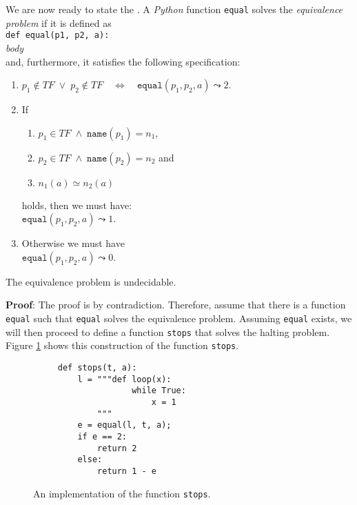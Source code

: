 \noindent
We are now ready to state the .  A \textsl{Python} function \texttt{equal} solves the
\emph{equivalence problem}  if it is defined as
\\[0.2cm]
\hspace*{1.3cm} \texttt{def equal(p1, p2, a):}               \\
\hspace*{2.1cm} \textsl{body}                                \\[0.2cm]
and, furthermore, it satisfies the following specification:
\begin{enumerate}
\item $p_1 \not\in T\!F \;\vee\; p_2 \not\in T\!F \quad\Leftrightarrow\quad \mathtt{equal}(p_1, p_2, a) \leadsto 2$.
\item If 
      \begin{enumerate}
      \item $p_1 \in T\!F \;\wedge\; \mathtt{name}(p_1) = n_1$,
      \item $p_2 \in T\!F \;\wedge\; \mathtt{name}(p_2) = n_2$ \quad and
      \item $n_1(a) \simeq n_2(a)$
      \end{enumerate}
      holds, then we must have: 
      \\[0.2cm]
      \hspace*{1.3cm} 
      $\mathtt{equal}(p_1, p_2, a) \leadsto 1$.
\item Otherwise we must have \\[0.2cm]
      \hspace*{1.3cm} 
      $\mathtt{equal}(p_1, p_2, a) \leadsto 0$.
\end{enumerate}


\begin{Theorem}
The equivalence problem is undecidable.  
\end{Theorem}

\noindent
\textbf{Proof}:
The proof is by contradiction.  Therefore, assume that there is a function \texttt{equal}
such that \texttt{equal} solves the equivalence problem.  Assuming \texttt{equal} exists, we will
then proceed to define a function \texttt{stops} that solves the halting problem.
Figure \ref{fig:stops} shows this construction of the function \texttt{stops}.


\begin{figure}[!h]
  \centering
\begin{verbatim}
     def stops(t, a):
         l = """def loop(x): 
                    while True:
                        x = 1
             """ 
         e = equal(l, t, a);
         if e == 2:
             return 2
         else:
             return 1 - e
\end{verbatim}
  \vspace*{-0.3cm}
  \caption{An implementation of the function \texttt{stops}.}
  \label{fig:stops}
\end{figure}


